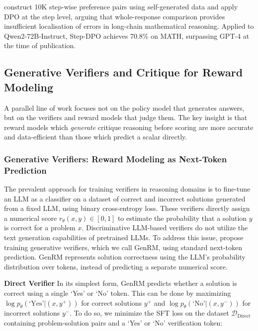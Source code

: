 \autocite{lai2024stepdpostepwisepreferenceoptimization} construct 10K step-wise preference pairs using self-generated data and apply DPO at the step level, arguing that whole-response comparison provides insufficient localisation of errors in long-chain mathematical reasoning. Applied to Qwen2-72B-Instruct, Step-DPO achieves 70.8\% on MATH, surpassing GPT-4 at the time of publication.

\subsection{Generative Verifiers and Critique for Reward Modeling}
\label{sec:verifier-rm}

A parallel line of work focuses not on the policy model that generates answers, but on the verifiers and reward models that judge them. The key insight is that reward models which \emph{generate} critique reasoning before scoring are more accurate and data-efficient than those which predict a scalar directly.

\subsubsection{Generative Verifiers: Reward Modeling as Next-Token Prediction}

The prevalent approach for training verifiers in reasoning domains is to fine-tune an LLM as a classifier on a dataset of correct and incorrect solutions generated from a fixed LLM, using binary cross-entropy loss. These verifiers directly assign a numerical score $r_\theta(x,y) \in [0,1]$ to estimate the probability that a solution $y$ is correct for a problem $x$. Discriminative LLM-based verifiers do not utilize the text generation capabilities of pretrained LLMs. To address this issue, \autocite{zhang2024generativeverifiersrewardmodeling} propose training generative verifiers, which we call GenRM, using standard next-token prediction. GenRM represents solution correctness using the LLM's probability distribution over tokens, instead of predicting a separate numerical score.

\vspace{1em}
\textbf{Direct Verifier} In its simplest form, GenRM predicts whether a solution is correct using a single `Yes' or `No' token. This can be done by maximizing $\log p_\theta(\text{`Yes'}|(x,y^+))$ for correct solutions $y^+$ and $\log p_\theta(\text{`No'}|(x,y^-))$ for incorrect solutions $y^-$. To do so, we minimize the SFT loss on the dataset $\mathcal{D}_{\text{Direct}}$ containing problem-solution pairs and a `Yes' or `No' verification token:

